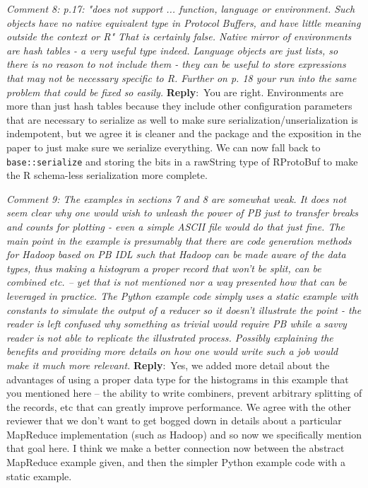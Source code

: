 \documentclass[10pt]{article}
\newcommand{\pointRaised}[2]{\smallskip %
  \textsl{{\fontseries{b}\selectfont #1}: #2}\newline}
\newcommand{\reply}[1]{\textbf{Reply}:\ #1 \smallskip } %
\begin{document}
\pointRaised{Comment 8}{p.17: "does not support ... function, language or environment. Such 
  objects have no native equivalent type in Protocol Buffers, and have 
  little meaning outside the context or R"
  That is certainly false. Native mirror of environments are hash tables - 
  a very useful type indeed. Language objects are just lists, so there is
  no reason to not include them - they can be useful to store expressions
  that may not be necessary specific to R. Further on p. 18 your run into
  the same problem that could be fixed so easily.}
\reply{You are right.  Environments are more than just hash
  tables because they include other configuration parameters that are
  necessary to serialize as well to make sure
  serialization/unserialization is indempotent, but we agree it is
  cleaner and the package and the exposition in the paper to just make
  sure we serialize everything.  We can now fall back to
  \texttt{base::serialize} and storing the bits in a rawString type of
  RProtoBuf to make the R schema-less serialization more complete.}

\pointRaised{Comment 9}{The examples in sections 7 and 8 are somewhat weak. It does not seem 
  clear why one would wish to unleash the power of PB just to transfer 
  breaks and counts for plotting - even a simple ASCII file would do that
  just fine. The main point in the example is presumably that there are 
  code generation methods for Hadoop based on PB IDL such that Hadoop can
  be made aware of the data types, thus making a histogram a proper record 
  that won't be split, can be combined etc. -- yet that is not mentioned 
  nor a way presented how that can be leveraged in practice. The Python 
  example code simply uses a static example with constants to simulate the 
  output of a reducer so it doesn't illustrate the point - the reader is 
  left confused why something as trivial would require PB while a savvy 
  reader is not able to replicate the illustrated process. Possibly 
  explaining the benefits and providing more details on how one would 
  write such a job would make it much more relevant.}
\reply{Yes, we added more detail about the advantages of using a
  proper data type for the histograms in this example that you mentioned here -- the
  ability to write combiners, prevent arbitrary splitting of the
  records, etc that can greatly improve performance.  We agree with
  the other reviewer that we don't want to get bogged down in details
  about a particular MapReduce implementation (such as Hadoop) and so
  now we specifically mention that goal here.
  I think we make a better connection now between the
  abstract MapReduce example given, and then the simpler Python
  example code with a static example.}
\end{document}
